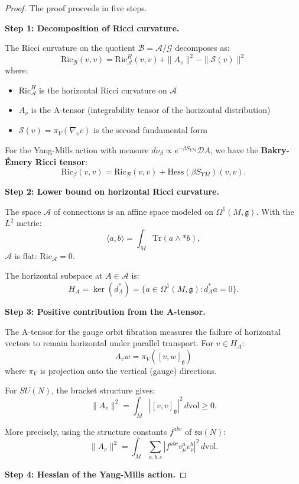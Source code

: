 \begin{proof}
The proof proceeds in five steps.

\textbf{Step 1: Decomposition of Ricci curvature.}

The Ricci curvature on the quotient $\mathcal{B} = \mathcal{A}/\mathcal{G}$ 
decomposes as:
\[
\mathrm{Ric}_{\mathcal{B}}(v, v) = \mathrm{Ric}_{\mathcal{A}}^H(v, v) 
+ \|A_v\|^2 - \|\mathcal{S}(v)\|^2
\]
where:
\begin{itemize}
\item $\mathrm{Ric}_{\mathcal{A}}^H$ is the horizontal Ricci curvature on $\mathcal{A}$
\item $A_v$ is the A-tensor (integrability tensor of the horizontal distribution)
\item $\mathcal{S}(v) = \pi_V(\nabla_v v)$ is the second fundamental form
\end{itemize}

For the Yang-Mills action with measure $d\nu_\beta \propto e^{-\beta S_{YM}} \mathcal{D}A$, 
we have the \textbf{Bakry-Émery Ricci tensor}:
\[
\mathrm{Ric}_{\beta}(v, v) = \mathrm{Ric}_{\mathcal{B}}(v, v) 
+ \mathrm{Hess}(\beta S_{YM})(v, v).
\]

\textbf{Step 2: Lower bound on horizontal Ricci curvature.}

The space $\mathcal{A}$ of connections is an affine space modeled on 
$\Omega^1(M, \mathfrak{g})$. With the $L^2$ metric:
\[
\langle a, b \rangle = \int_M \mathrm{Tr}(a \wedge *b),
\]
$\mathcal{A}$ is flat: $\mathrm{Ric}_{\mathcal{A}} = 0$.

The horizontal subspace at $A \in \mathcal{A}$ is:
\[
H_A = \ker(d_A^*) = \{a \in \Omega^1(M, \mathfrak{g}) : d_A^* a = 0\}.
\]

\textbf{Step 3: Positive contribution from the A-tensor.}

The A-tensor for the gauge orbit fibration measures the failure of 
horizontal vectors to remain horizontal under parallel transport. 
For $v \in H_A$:
\[
A_v w = \pi_V([v, w]_{\mathfrak{g}})
\]
where $\pi_V$ is projection onto the vertical (gauge) directions.

For $SU(N)$, the bracket structure gives:
\[
\|A_v\|^2 = \int_M |[v, v]_{\mathfrak{g}}|^2 \, d\mathrm{vol} \geq 0.
\]

More precisely, using the structure constants $f^{abc}$ of $\mathfrak{su}(N)$:
\[
\|A_v\|^2 = \int_M \sum_{a,b,c} |f^{abc} v^a_\mu v^b_\nu|^2 \, d\mathrm{vol}.
\]

\textbf{Step 4: Hessian of the Yang-Mills action.}


\end{proof}
